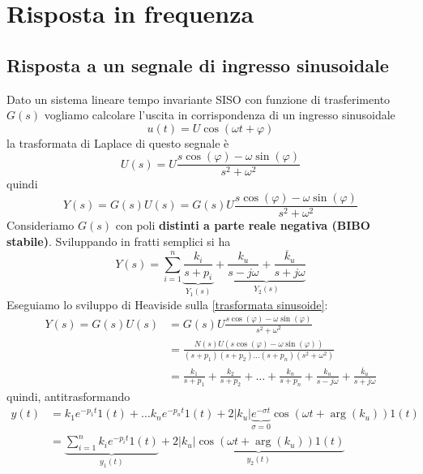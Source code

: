 \documentclass{article}
\numberwithin{equation}{subsection}
\let\oldsection\section%
\renewcommand{\section}{%
  \renewcommand{\theequation}{\thesection.\arabic{equation}}%
  \oldsection}%
\let\oldsubsection\subsection%
\renewcommand{\subsection}{%
  \renewcommand{\theequation}{\thesubsection.\arabic{equation}}%
  \oldsubsection}%
\begin{document}
\section{Risposta in frequenza}
\subsection{Risposta a un segnale di ingresso sinusoidale}
Dato un sistema lineare tempo invariante SISO con funzione di trasferimento $G(s)$ vogliamo calcolare l'uscita in corrispondenza di un ingresso sinusoidale
\begin{equation}
    u(t) = U \cos(\omega t + \varphi)
\end{equation}
la trasformata di Laplace di questo segnale è
\begin{equation}
    U(s) = U \frac{s \cos(\varphi) - \omega \sin(\varphi)}{s^2 + \omega^2}
\end{equation}
quindi
\begin{equation}\label{trasformata sinusoide}
    Y(s) = G(s) U(s) = G(s) U \frac{s \cos(\varphi) - \omega \sin(\varphi)}{s^2 + \omega^2}
\end{equation}
Consideriamo $G(s)$ con poli \textbf{distinti a parte reale negativa (BIBO stabile)}. Sviluppando in fratti semplici si ha
\begin{equation}
    Y(s) = \sum_{i=1}^n \underbrace{\frac{k_i}{s+p_i}}_{Y_1(s)} + \underbrace{\frac{k_u}{s-j \omega} + \frac{\overline{k}_u}{s+j \omega}}_{Y_2(s)}
\end{equation}
Eseguiamo lo sviluppo di Heaviside sulla \ref{trasformata sinusoide}:
\begin{align}
    Y(s) = G(s) U(s) &= G(s) U \frac{s \cos(\varphi) - \omega \sin(\varphi)}{s^2 + \omega^2}
    \\
    &=\frac{N(s)U(s \cos(\varphi) - \omega \sin(\varphi))}{(s+p_1)(s+p_2) \dots (s+p_n)(s^2 + \omega^2)}
    \\
    &= \frac{k_1}{s+p_1} + \frac{k_2}{s+p_2} + \dots + \frac{k_n}{s+p_n} + \frac{k_u}{s-j \omega} + \frac{\overline{k}_u}{s+j \omega}
\end{align}
quindi, antitrasformando
\begin{align}
    y(t) &= k_1 e^{-p_1t}1(t) + \dots k_n e^{-p_n t}1(t) + 2 |k_u|\underbrace{e^{- \sigma t}}_{\sigma = 0} \cos (\omega t + \arg(k_u))1(t)
    \\
    &= \underbrace{\sum_{i=1}^n k_i e^{-p_i t}1(t)}_{y_1(t)} + \underbrace{2 |k_u| \cos (\omega t + \arg(k_u))1(t)}_{y_2(t)}
\end{align}
\end{document}
